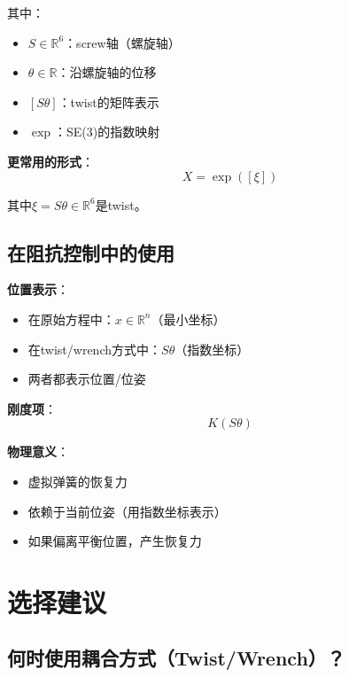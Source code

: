 \documentclass[12pt,a4paper]{article}
\begin{document}
其中：
\begin{itemize}
\item $S \in \mathbb{R}^6$：screw轴（螺旋轴）
\item $\theta \in \mathbb{R}$：沿螺旋轴的位移
\item $[S\theta]$：twist的矩阵表示
\item $\exp$：SE(3)的指数映射
\end{itemize}

\textbf{更常用的形式}：
\begin{equation}
X = \exp([\xi])
\end{equation}

其中$\xi = S\theta \in \mathbb{R}^6$是twist。

\subsection{在阻抗控制中的使用}

\textbf{位置表示}：
\begin{itemize}
\item 在原始方程中：$x \in \mathbb{R}^n$（最小坐标）
\item 在twist/wrench方式中：$S\theta$（指数坐标）
\item 两者都表示位置/位姿
\end{itemize}

\textbf{刚度项}：
\begin{equation}
K(S\theta)
\end{equation}

\textbf{物理意义}：
\begin{itemize}
\item 虚拟弹簧的恢复力
\item 依赖于当前位姿（用指数坐标表示）
\item 如果偏离平衡位置，产生恢复力
\end{itemize}

\section{选择建议}

\subsection{何时使用耦合方式（Twist/Wrench）？}
\end{document}
